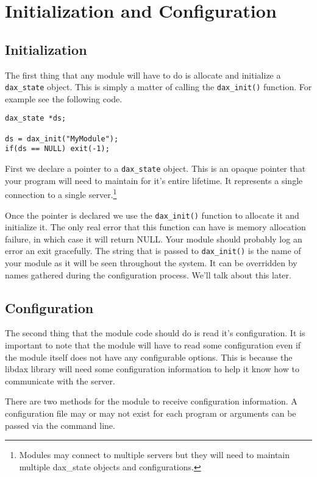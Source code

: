 \chapter{Initialization and Configuration}


\section{Initialization}

The first thing that any module will have to do is allocate and initialize a
\verb|dax_state| object.  This is simply a matter of
calling the \verb|dax_init()| function.  For example
see the following code.

\begin{verbatim}
dax_state *ds;

ds = dax_init("MyModule");
if(ds == NULL) exit(-1);
\end{verbatim}

First we declare a pointer to a \verb|dax_state| object.  This is an opaque
pointer that your program will need to maintain for it's entire lifetime.  It
represents a single connection to a single server.\footnote{Modules may connect to multiple servers
	but they will need to maintain multiple dax\_state objects and configurations.}

Once the pointer is declared we use the \verb|dax_init()| function to allocate
it and initialize it.  The only real error that this function can have is
memory allocation failure, in which case it will return NULL.  Your module
should probably log an error an exit gracefully.  The string that is passed to
\verb|dax_init()| is the name of your module as it will be seen throughout the
system.  It can be overridden by names gathered during the configuration
process.  We'll talk about this later.


\section{Configuration}

The second thing that the module code should do is read it's configuration.  It
is important to note that the module will have to read some configuration even
if the module itself does not have any configurable options. This is because the
libdax library will need some configuration information to help it know how to
communicate with the server.

There are two methods for the module to receive configuration information.
A configuration file may or may not exist for each program or arguments can
be passed via the command line.

